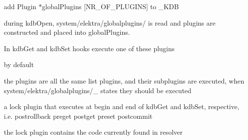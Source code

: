 \begin{DoxyItemize}
\item add {\ttfamily Plugin $\ast$global\+Plugins \mbox{[}N\+R\+\_\+\+O\+F\+\_\+\+P\+L\+U\+G\+I\+NS\mbox{]}} to {\ttfamily \+\_\+\+K\+DB}
\item during {\ttfamily kdb\+Open}, {\ttfamily system/elektra/globalplugins/} is read and plugins are constructed and placed into {\ttfamily global\+Plugins}.
\item In kdb\+Get and kdb\+Set hooks execute one of these plugins
\item by default
\begin{DoxyItemize}
\item the plugins are all the same {\ttfamily list} plugins, and their subplugins are executed, when {\ttfamily system/elektra/globalplugins/\+\_\+} states they should be executed
\item a {\ttfamily lock} plugin that executes at begin and end of kdb\+Get and kdb\+Set, respective, i.\+e. postrollback preget postget preset postcommit
\item the {\ttfamily lock} plugin contains the code currently found in resolver 
\end{DoxyItemize}
\end{DoxyItemize}